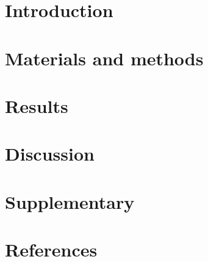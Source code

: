 \documentclass[12pt,twoside]{report}
\begin{document}
\chapter{Introduction}



\chapter{Materials and methods}


\chapter{Results}


\chapter{Discussion}

\chapter{Supplementary}

\chapter{References}
\printbibliography

\end{document}

